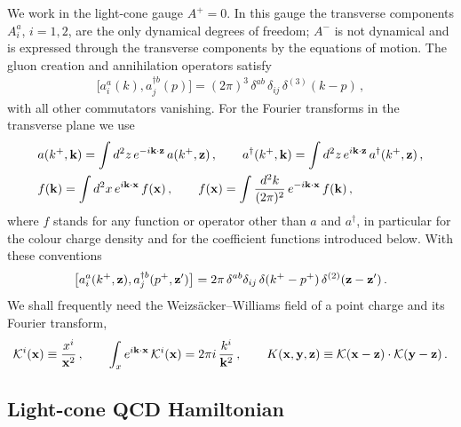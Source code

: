 We work in the light-cone gauge $A^+=0$. In this gauge the transverse components $A^a_i$, $i=1,2$, are the only dynamical degrees of freedom; $A^-$ is not dynamical and is expressed through the transverse components by the equations of motion. The gluon creation and annihilation operators satisfy
\begin{align}\label{eq:aadagger}
\big[a^a_i(k),a^{\dagger b}_j(p)\big]=(2\pi)^3\,\delta^{ab}\,\delta_{ij}\,\delta^{(3)}(k-p)\,,
\end{align}
with all other commutators vanishing. For the Fourier transforms in the transverse plane we use
\begin{align}\label{eq:FTconventions}
&a(k^+,\mathbf{k})=\int d^2z\,e^{-i\mathbf{k}\cdot\mathbf{z}}\,a(k^+,\mathbf{z})\,,\qquad
a^\dagger(k^+,\mathbf{k})=\int d^2z\,e^{i\mathbf{k}\cdot\mathbf{z}}\,a^\dagger(k^+,\mathbf{z})\,,\notag\\
&f(\mathbf{k})=\int d^2x\,e^{i\mathbf{k}\cdot\mathbf{x}}\,f(\mathbf{x})\,,\qquad f(\mathbf{x})=\int\frac{d^2k}{(2\pi)^2}\,e^{-i\mathbf{k}\cdot\mathbf{x}}\,f(\mathbf{k})\,,
\end{align}
where $f$ stands for any function or operator other than $a$ and $a^\dagger$, in particular for the colour charge density and for the coefficient functions introduced below. With these conventions
\begin{align}\label{eq:aadaggerX}
\big[a^a_i(k^+,\mathbf{z}),a^{\dagger b}_j(p^+,\mathbf{z}')\big]=2\pi\,\delta^{ab}\delta_{ij}\,\delta(k^+-p^+)\,\delta^{(2)}(\mathbf{z}-\mathbf{z}')\,.
\end{align}
We shall frequently need the Weizs\"acker--Williams field of a point charge and its Fourier transform,
\begin{align}\label{eq:kernels}
\mathcal{K}^i(\mathbf{x})\equiv\frac{x^i}{\mathbf{x}^2}\,,\qquad \int_x e^{i\mathbf{k}\cdot\mathbf{x}}\,\mathcal{K}^i(\mathbf{x})=2\pi i\,\frac{k^i}{\mathbf{k}^2}\,,\qquad
K(\mathbf{x},\mathbf{y},\mathbf{z})\equiv\mathcal{K}(\mathbf{x}-\mathbf{z})\cdot\mathcal{K}(\mathbf{y}-\mathbf{z})\,.
\end{align}

\subsection{Light-cone QCD Hamiltonian}\label{sec:hamiltonian}

